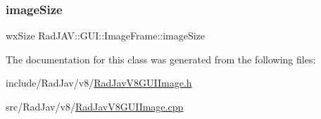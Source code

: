 \subsubsection{\texorpdfstring{image\+Size}{imageSize}}
{\footnotesize\ttfamily wx\+Size Rad\+J\+A\+V\+::\+G\+U\+I\+::\+Image\+Frame\+::image\+Size\hspace{0.3cm}{\ttfamily [protected]}}



The documentation for this class was generated from the following files\+:\begin{DoxyCompactItemize}
\item 
include/\+Rad\+Jav/v8/\mbox{\hyperlink{_rad_jav_v8_g_u_i_image_8h}{Rad\+Jav\+V8\+G\+U\+I\+Image.\+h}}\item 
src/\+Rad\+Jav/v8/\mbox{\hyperlink{_rad_jav_v8_g_u_i_image_8cpp}{Rad\+Jav\+V8\+G\+U\+I\+Image.\+cpp}}\end{DoxyCompactItemize}
